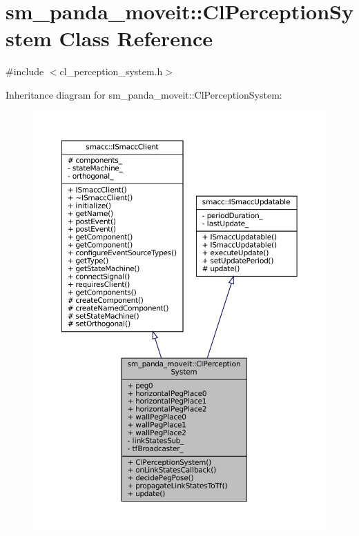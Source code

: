 \hypertarget{classsm__panda__moveit_1_1ClPerceptionSystem}{}\section{sm\+\_\+panda\+\_\+moveit\+:\+:Cl\+Perception\+System Class Reference}
\label{classsm__panda__moveit_1_1ClPerceptionSystem}


{\ttfamily \#include $<$cl\+\_\+perception\+\_\+system.\+h$>$}



Inheritance diagram for sm\+\_\+panda\+\_\+moveit\+:\+:Cl\+Perception\+System\+:
\nopagebreak
\begin{figure}[H]
\begin{center}
\leavevmode
\includegraphics[width=350pt]{classsm__panda__moveit_1_1ClPerceptionSystem__inherit__graph}
\end{center}
\end{figure}


